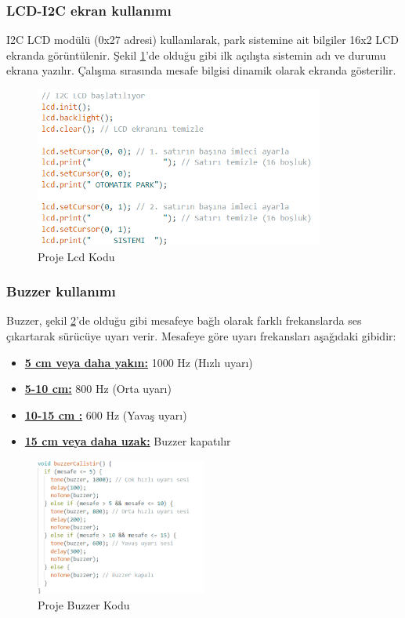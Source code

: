 \subsubsection{LCD-I2C ekran kullanımı}
    I2C LCD modülü (0x27 adresi) kullanılarak, park sistemine ait bilgiler 16x2 LCD ekranda görüntülenir. Şekil \ref{fig:25}'de olduğu gibi ilk açılışta sistemin adı ve durumu ekrana yazılır. Çalışma sırasında mesafe bilgisi dinamik olarak ekranda gösterilir.
\begin{figure}[H]
\centering
\includegraphics[width=0.85\textwidth]{Resimler/25.png}
\caption{Proje Lcd Kodu}
\label{fig:25}
\end{figure}
\subsubsection{Buzzer kullanımı}
    Buzzer, şekil \ref{fig:26}'de olduğu gibi mesafeye bağlı olarak farklı frekanslarda ses çıkartarak sürücüye uyarı verir. Mesafeye göre uyarı frekansları aşağıdaki gibidir:
\begin{itemize}
    \item \textbf{\underline{5 cm veya daha yakın:}} 1000 Hz (Hızlı uyarı)
    \item \textbf{\underline{5-10 cm:}} 800 Hz (Orta uyarı)
    \item \textbf{\underline{10-15 cm :}} 600 Hz (Yavaş uyarı)
    \item \textbf{\underline{15 cm veya daha uzak:}} Buzzer kapatılır
\end{itemize}

\begin{figure}[H]
\centering
\includegraphics[width=0.50\textwidth]{Resimler/26.png}
\caption{Proje Buzzer Kodu}
\label{fig:26}
\end{figure}

